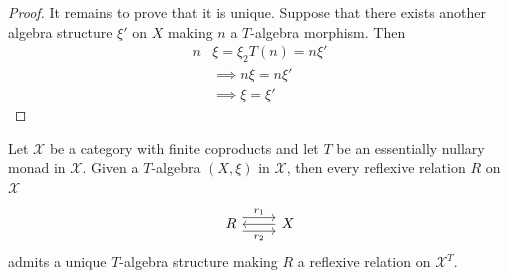 \begin{subbox}{}
\begin{proof}
It remains to prove that it is unique. Suppose that there exists another algebra structure $\xi'$ on $X$ making $n$ a $T$-algebra morphism. Then
\begin{align*}
    n & \xi = \xi_2 T(n) = n \xi' \\[1.5ex]
    & \implies n \xi = n \xi' \\[1.5ex]
    & \implies \xi = \xi'
\end{align*}
    \end{proof}
\end{subbox}

\begin{mainbox}{}
\begin{cor}\label{T-algebra in the reflexive relation}
    Let $\mathcal{X}$ be a category with finite coproducts and let $T$ be an essentially nullary monad in $\mathcal{X}$. Given a $T$-algebra $(X,\xi)$ in $\mathcal{X}$, then every reflexive relation $R$ on $\mathcal{X}$
    \[
\begin{tikzcd}
R \arrow[r, "r_1", shift left=2] \arrow[r, "r_2"', shift right=2] & X \arrow[l]
\end{tikzcd}
    \]
    admits a unique $T$-algebra structure making $R$ a reflexive relation on $\mathcal{X}^T$.
\end{cor}
\end{mainbox}

